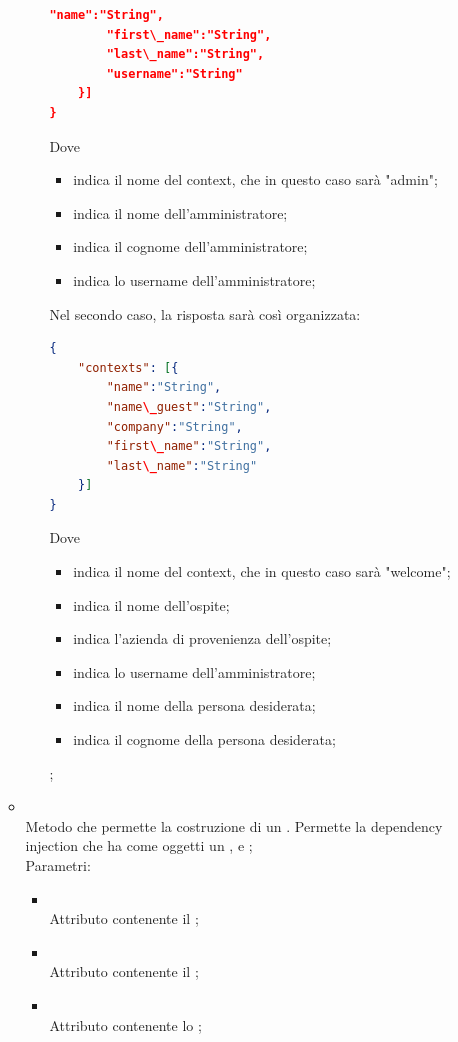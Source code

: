 \begin{itemize}
\begin{itemize}
\begin{itemize}
\begin{lstlisting}[language=json,firstnumber=1]
        "name":"String",
        "first\_name":"String",
        "last\_name":"String",
        "username":"String"
    }]
}
\end{lstlisting}
Dove
\begin{itemize}
    \item {} indica il nome del context, che in questo caso sarà "admin";
    \item {} indica il nome dell'amministratore;
    \item {} indica il cognome dell'amministratore;
    \item {} indica lo username dell'amministratore;
\end{itemize}
Nel secondo caso, la risposta sarà così organizzata:
\begin{lstlisting}[language=json,firstnumber=1]
{
    "contexts": [{
        "name":"String",
        "name\_guest":"String",
        "company":"String",
        "first\_name":"String",
        "last\_name":"String"
    }]
}
\end{lstlisting}
Dove
\begin{itemize}
    \item {} indica il nome del context, che in questo caso sarà "welcome";
    \item {} indica il nome dell'ospite;
    \item {} indica l'azienda di provenienza dell'ospite;
    \item {} indica lo username dell'amministratore;
    \item {} indica il nome della persona desiderata;
    \item {} indica il cognome della persona desiderata;
\end{itemize};
		\end{itemize}
		\item[]  \\
		Metodo che permette la costruzione di un . Permette la dependency injection che ha come oggetti un ,  e ;\\
		Parametri:
		\begin{itemize}
			\item {} \\
			Attributo contenente il  ;
			\item {} \\
			Attributo contenente il ;
			\item {} \\
			Attributo contenente lo ;
		\end{itemize}
	\end{itemize}
\end{itemize}

